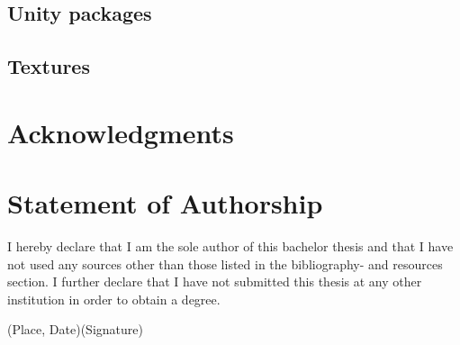 \documentclass[a4paper, twoside, 10pt]{report}
\begin{document}
\section{Unity packages}
\section{Textures}




\listoffigures
\listoftables

\chapter*{Acknowledgments}

\chapter*{Statement of Authorship}
I hereby declare that I am the sole author of this bachelor thesis and that I have not used any sources other than those listed in the bibliography- and resources section. I further declare that I have not submitted this thesis at any other institution in order to obtain a degree.
\begin{spacing}{4}
\noindent
(Place, Date)\dotfill \space (Signature)\dotfill
\end{spacing}
\end{document}

